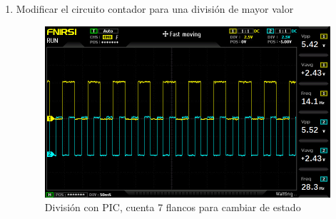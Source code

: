 \begin{enumerate} [label={\alph*.}]
\begin{figure}[H]
        \caption{División con PIC, cuenta 1 flanco para cambiar de estado}
    \end{figure}
    \item Modificar el circuito contador para una división de mayor valor
    \begin{figure}[H]
        \centering
        \includegraphics[width=.8\textwidth]{imgs/5.6. Más frecuencia.jpg}
        \caption{División con PIC, cuenta 7 flancos para cambiar de estado}
    \end{figure}
\end{enumerate}
